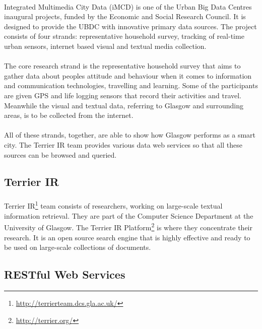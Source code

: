 \documentclass{l4proj}
\begin{document}
\paragraph{}
Integrated Multimedia City Data\cite{imcd} (iMCD) is one of the Urban Big Data Centre\textquotesingle s inaugural projects, funded by the Economic and Social Research Council. It is designed to provide the UBDC with innovative primary data sources. The project consists of four strands: representative household survey, tracking of real-time urban sensors, internet based visual and textual media collection.  
\paragraph{}
The core research strand is the representative household survey that aims to gather data about people\textquotesingle s attitude and behaviour when it comes to information and communication technologies, travelling and learning. Some of the participants are given GPS and life logging sensors that record their activities and travel. Meanwhile the visual and textual data, referring to Glasgow and surrounding areas, is to be collected from the internet. 
\paragraph{}
All of these strands, together, are able to show how Glasgow performs as a smart city.  The Terrier IR team provides various data web services so that all these sources can be browsed and queried.

\subsection{Terrier IR}
\paragraph{}
Terrier IR\footnote{\url{http://terrierteam.dcs.gla.ac.uk/}} team consists of researchers, working on large-scale textual information retrieval. They are part of the Computer Science Department at the University of Glasgow. The Terrier IR Platform\footnote{\url{http://terrier.org/}} is where they concentrate their research. It is an open source search engine that is highly effective and ready to be used on large-scale collections of documents. 

\subsection{RESTful Web Services}
\end{document}

